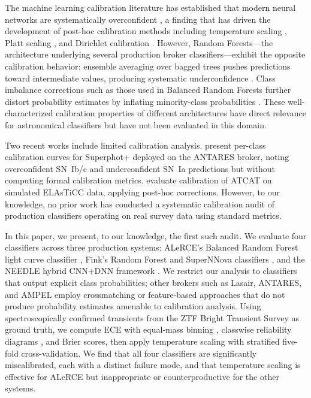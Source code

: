 \documentclass[twocolumn]{aastex631}
\begin{document}
The machine learning calibration literature has established that modern neural networks are systematically overconfident \citep{guo2017}, a finding that has driven the development of post-hoc calibration methods including temperature scaling \citep{guo2017}, Platt scaling \citep{platt1999}, and Dirichlet calibration \citep{kull2019}. However, Random Forests---the architecture underlying several production broker classifiers---exhibit the opposite calibration behavior: ensemble averaging over bagged trees pushes predictions toward intermediate values, producing systematic underconfidence \citep{niculescumizil2005, bostrom2008}. Class imbalance corrections such as those used in Balanced Random Forests further distort probability estimates by inflating minority-class probabilities \citep{vandengoorbergh2022}. These well-characterized calibration properties of different architectures have direct relevance for astronomical classifiers but have not been evaluated in this domain.

Two recent works include limited calibration analysis. \citet{desoto2024} present per-class calibration curves for Superphot+ deployed on the ANTARES broker, noting overconfident SN~Ib/c and underconfident SN~Ia predictions but without computing formal calibration metrics. \citet{tung2025} evaluate calibration of ATCAT on simulated ELAsTiCC data, applying post-hoc corrections. However, to our knowledge, no prior work has conducted a systematic calibration audit of production classifiers operating on real survey data using standard metrics.

In this paper, we present, to our knowledge, the first such audit. We evaluate four classifiers across three production systems: ALeRCE's Balanced Random Forest light curve classifier \citep[lc\_classifier v1.1.13;][]{sanchezsaez2021}, Fink's Random Forest and SuperNNova classifiers \citep{leoni2022, moller2020}, and the NEEDLE hybrid CNN+DNN framework \citep{sheng2024}. We restrict our analysis to classifiers that output explicit class probabilities; other brokers such as Lasair, ANTARES, and AMPEL employ crossmatching or feature-based approaches that do not produce probability estimates amenable to calibration analysis. Using spectroscopically confirmed transients from the ZTF Bright Transient Survey \citep[BTS;][]{fremling2020, perley2020} as ground truth, we compute ECE with equal-mass binning \citep{roelofs2022}, classwise reliability diagrams \citep{nixon2019}, and Brier scores, then apply temperature scaling with stratified five-fold cross-validation. We find that all four classifiers are significantly miscalibrated, each with a distinct failure mode, and that temperature scaling is effective for ALeRCE but inappropriate or counterproductive for the other systems.
\end{document}
